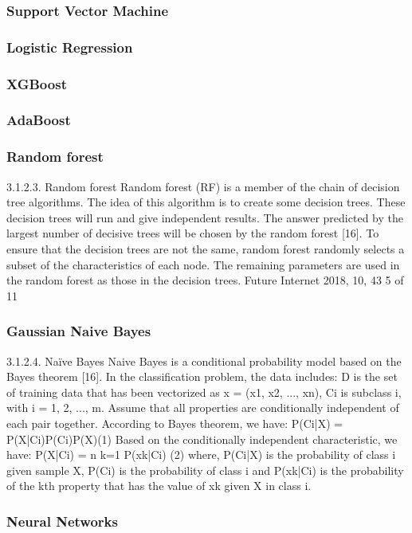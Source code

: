\subsubsection{Support Vector Machine}
\subsubsection{Logistic Regression}
\subsubsection{XGBoost}
\subsubsection{AdaBoost}
\subsubsection{Random forest}
3.1.2.3. Random forest
Random forest (RF) is a member of the chain of decision tree algorithms. The idea of this algorithm
is to create some decision trees. These decision trees will run and give independent results. The answer
predicted by the largest number of decisive trees will be chosen by the random forest [16]. To ensure
that the decision trees are not the same, random forest randomly selects a subset of the characteristics
of each node. The remaining parameters are used in the random forest as those in the decision trees.
Future Internet 2018, 10, 43 5 of 11

\subsubsection{Gaussian Naive Bayes}
3.1.2.4. Naïve Bayes
Naive Bayes is a conditional probability model based on the Bayes theorem [16]. In the
classification problem, the data includes: D is the set of training data that has been vectorized as
x = (x1, x2, ..., xn), Ci
is subclass i, with i = {1, 2, ..., m}. Assume that all properties are conditionally
independent of each pair together. According to Bayes theorem, we have:
P(Ci|X) = P(X|Ci)P(Ci)P(X)(1)
Based on the conditionally independent characteristic, we have:
P(X|Ci) = n k=1 P(xk|Ci) (2)
where, P(Ci|X) is the probability of class i given sample X, P(Ci) is the probability of class i and P(xk|Ci)
is the probability of the kth property that has the value of xk given X in class i.
\subsubsection{Neural Networks}

